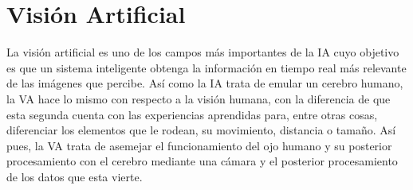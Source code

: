 \section{Visión Artificial}
\label{sec:subseccion}
La visión artificial es uno de los campos más importantes de la IA cuyo objetivo es que un sistema inteligente obtenga la información en tiempo real más relevante de las imágenes que percibe. Así como la IA trata de emular un cerebro humano, la VA hace lo mismo con respecto a la visión humana, con la diferencia de que esta segunda cuenta con las experiencias aprendidas para, entre otras cosas, diferenciar los elementos que le rodean, su movimiento, distancia o tamaño. Así pues, la VA trata de asemejar el funcionamiento del ojo humano y su posterior procesamiento con el cerebro mediante  una cámara y el posterior procesamiento de los datos que esta vierte.\\

